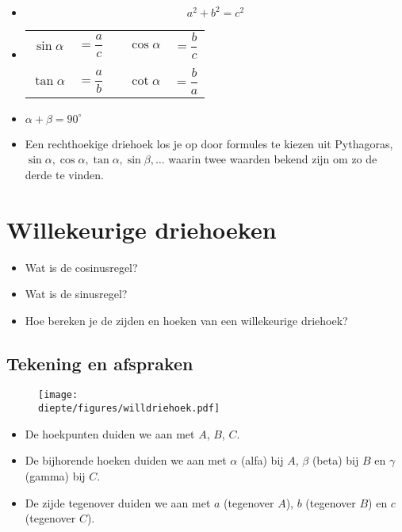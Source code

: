 \documentclass[a4paper,12pt]{article}
\newcommand{\diepte}{./}
\begin{document}
\begin{framed}
\begin{itemize}
	\item {}
	\[a^2+b^2=c^2\]
	\item {}
	\begin{center}
\begin{tabular}{ccccc}
$\sin \alpha$ &$= \dfrac{a}{c}$ &\qquad\qquad\qquad& $\cos \alpha$ &$= \dfrac{b}{c}$\\
&&&&\\
$\tan \alpha$ &$= \dfrac{a}{b}$ &\qquad\qquad\qquad& $\cot \alpha$ &$= \dfrac{b}{a}$
\end{tabular}
\end{center}
	\item $\alpha + \beta = 90^\circ$
	\item Een rechthoekige driehoek los je op door formules te kiezen uit Pythagoras, $\sin \alpha, \cos \alpha, \tan\alpha, \sin \beta, \ldots$ waarin twee waarden bekend zijn om zo de derde te vinden.
\end{itemize}
\end{framed}

\newpage

\section{Willekeurige driehoeken}

\begin{itemize}
	\item Wat is de cosinusregel?
	\item Wat is de sinusregel?
	\item Hoe bereken je de zijden en hoeken van een willekeurige driehoek?
\end{itemize}

\subsection{Tekening en afspraken}

\begin{figure}[h]
\begin{center}
\texttt{[image: \\diepte/figures/willdriehoek.pdf]}
\end{center}
\end{figure}

\begin{itemize}
	\item De hoekpunten duiden we aan met $A$, $B$, $C$.
	\item De bijhorende hoeken duiden we aan met $\alpha$ (alfa) bij $A$, $\beta$ (beta) bij $B$ en $\gamma$ (gamma) bij $C$.
	\item De zijde tegenover duiden we aan met $a$ (tegenover $A$), $b$ (tegenover $B$) en $c$ (tegenover $C$).
\end{itemize}
\end{document}
